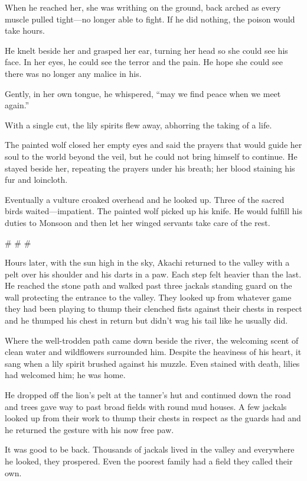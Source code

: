 When he reached her, she was writhing on the ground, back arched as every muscle pulled tight---no longer able to fight. If he did nothing, the poison would take hours.

He knelt beside her and grasped her ear, turning her head so she could see his face. In her eyes, he could see the terror and the pain. He hope she could see there was no longer any malice in his.

Gently, in her own tongue, he whispered, ``may we find peace when we meet again.''

With a single cut, the lily spirits flew away, abhorring the taking of a life.

The painted wolf closed her empty eyes and said the prayers that would guide her soul to the world beyond the veil, but he could not bring himself to continue. He stayed beside her, repeating the prayers under his breath; her blood staining his fur and loincloth.

Eventually a vulture croaked overhead and he looked up. Three of the sacred birds waited---impatient. The painted wolf picked up his knife. He would fulfill his duties to Monsoon and then let her winged servants take care of the rest.

\# \# \#

Hours later, with the sun high in the sky, Akachi returned to the valley with a pelt over his shoulder and his darts in a paw. Each step felt heavier than the last. He reached the stone path and walked past three jackals standing guard on the wall protecting the entrance to the valley. They looked up from whatever game they had been playing to thump their clenched fists against their chests in respect and he thumped his chest in return but didn't wag his tail like he usually did.

Where the well-trodden path came down beside the river, the welcoming scent of clean water and wildflowers surrounded him. Despite the heaviness of his heart, it sang when a lily spirit brushed against his muzzle. Even stained with death, lilies had welcomed him; he was home.

He dropped off the lion's pelt at the tanner's hut and continued down the road and trees gave way to past broad fields with round mud houses. A few jackals looked up from their work to thump their chests in respect as the guards had and he returned the gesture with his now free paw.

It was good to be back. Thousands of jackals lived in the valley and everywhere he looked, they prospered. Even the poorest family had a field they called their own.

